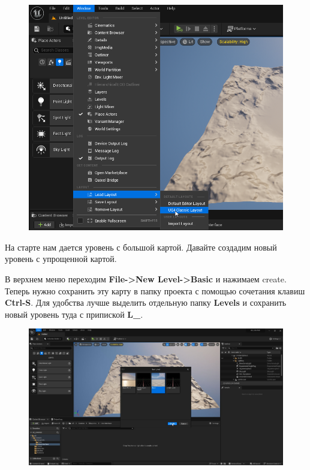 \begin{figure}[h]
    \centering
    \includegraphics*[width = \textwidth]{Lections/Layout.png}
\end{figure}


На старте нам дается уровень с большой картой. Давайте создадим новый уровень с упрощенной картой.

В верхнем меню переходим \textbf{File->New Level->Basic} и нажимаем create. Теперь нужно сохранить эту карту в папку проекта с помощью сочетания клавиш \textbf{Ctrl-S}. Для удобства лучше выделить отдельную папку \textbf{Levels} и сохранить новый уровень туда с припиской \textbf{L\_}.


\begin{figure}[h]
    \centering
    \includegraphics*[width = \textwidth]{Lections/LevelChange.jpg}
\end{figure}

